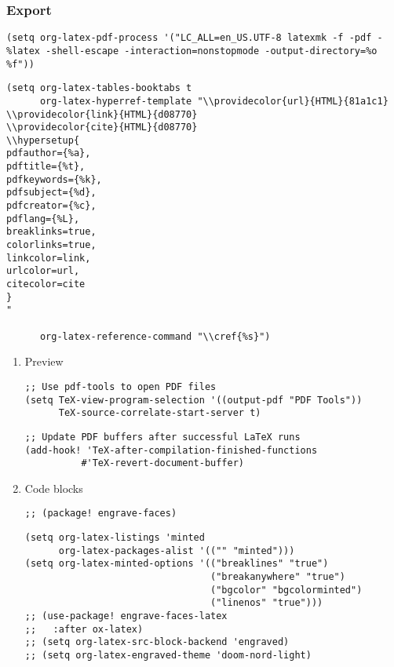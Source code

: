 \documentclass[c]{article}
\theoremstyle{plain}%
\theoremstyle{definition}
\theoremstyle{remark}
\begin{document}
\subsubsection{Export}
\label{sec:org7eb6e10}
\begin{verbatim}
(setq org-latex-pdf-process '("LC_ALL=en_US.UTF-8 latexmk -f -pdf -%latex -shell-escape -interaction=nonstopmode -output-directory=%o %f"))
\end{verbatim}
\begin{verbatim}
(setq org-latex-tables-booktabs t
      org-latex-hyperref-template "\\providecolor{url}{HTML}{81a1c1}
\\providecolor{link}{HTML}{d08770}
\\providecolor{cite}{HTML}{d08770}
\\hypersetup{
pdfauthor={%a},
pdftitle={%t},
pdfkeywords={%k},
pdfsubject={%d},
pdfcreator={%c},
pdflang={%L},
breaklinks=true,
colorlinks=true,
linkcolor=link,
urlcolor=url,
citecolor=cite
}
"

      org-latex-reference-command "\\cref{%s}")
\end{verbatim}
\begin{enumerate}
\item Preview
\label{sec:org8fcf164}
\begin{verbatim}
;; Use pdf-tools to open PDF files
(setq TeX-view-program-selection '((output-pdf "PDF Tools"))
      TeX-source-correlate-start-server t)
\end{verbatim}
\begin{verbatim}
;; Update PDF buffers after successful LaTeX runs
(add-hook! 'TeX-after-compilation-finished-functions
          #'TeX-revert-document-buffer)
\end{verbatim}
\item Code blocks
\label{sec:org93478c1}
\begin{verbatim}
;; (package! engrave-faces)
\end{verbatim}
\begin{verbatim}
(setq org-latex-listings 'minted
      org-latex-packages-alist '(("" "minted")))
(setq org-latex-minted-options '(("breaklines" "true")
                                 ("breakanywhere" "true")
                                 ("bgcolor" "bgcolorminted")
                                 ("linenos" "true")))
;; (use-package! engrave-faces-latex
;;   :after ox-latex)
;; (setq org-latex-src-block-backend 'engraved)
;; (setq org-latex-engraved-theme 'doom-nord-light)
\end{verbatim}
\end{enumerate}
\end{document}
